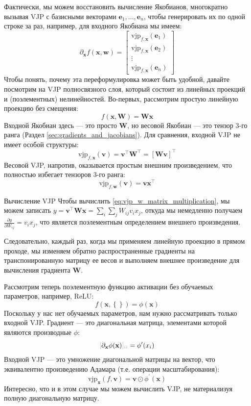 Фактически, мы можем восстановить вычисление Якобианов, многократно вызывая VJP с базисными векторами $\mathbf{e}_1, \ldots, \mathbf{e}_n$, чтобы генерировать их по одной строке за раз, например, для входного Якобиана мы имеем:
%
$$\partial_{\mathbf{x}}f(\mathbf{x},\mathbf{w})=\begin{bmatrix} \text{vjp}_{f,\mathbf{x}}(\mathbf{e}_1) \\ \text{vjp}_{f,\mathbf{x}}(\mathbf{e}_2) \\ \vdots\\ \text{vjp}_{f,\mathbf{x}}(
\mathbf{e}_n) \end{bmatrix}$$
%
Чтобы понять, почему эта переформулировка может быть удобной, давайте посмотрим на VJP полносвязного слоя, который состоит из линейных проекций и (поэлементных) нелинейностей. Во-первых, рассмотрим простую линейную проекцию без смещения:
%
$$
f(\mathbf{x}, \mathbf{W})=\mathbf{W}\mathbf{x}
$$
%
Входной Якобиан здесь — это просто $\mathbf{W}$, но весовой Якобиан — это тензор 3-го ранга (Раздел \ref{sec:gradients_and_jacobians}). Для сравнения, входной VJP не имеет особой структуры:
%
\begin{equation}
\text{vjp}_{f, \mathbf{x}}(\mathbf{v})=\mathbf{v}^\top\mathbf{W}^\top = \left[\mathbf{W}\mathbf{v}\right]^\top
\label{eq:vjp_x_matrix_multiplication}
\end{equation}
%
Весовой VJP, напротив, оказывается простым внешним произведением, что полностью избегает тензоров 3-го ранга:
%
\begin{equation}
\text{vjp}_{f,\mathbf{w}}(\mathbf{v}) = \mathbf{v}\mathbf{x}^\top
\label{eq:vjp_w_matrix_multiplication}
\end{equation}
%
\begin{supportbox}{Вычисление VJP}
Чтобы вычислить \eqref{eq:vjp_w_matrix_multiplication}, мы можем записать $y=\mathbf{v}^\top \mathbf{W}\mathbf{x} =\sum_i\sum_j W_{ij}v_ix_j$, откуда мы немедленно получаем $\frac{\partial y}{\partial W_{ij}} = v_ix_j$, что является поэлементным определением внешнего произведения.
\end{supportbox}
%
Следовательно, каждый раз, когда мы применяем линейную проекцию в прямом проходе, мы изменяем обратно распространенные градиенты на транспонированную матрицу ее весов и выполняем внешнее произведение для вычисления градиента $\mathbf{W}$. 

Рассмотрим теперь поэлементную функцию активации без обучаемых параметров, например, ReLU:
%
$$
f(\mathbf{x},\left\{\right\})=\phi(\mathbf{x})
$$
%
Поскольку у нас нет обучаемых параметров, нам нужно рассматривать только входной VJP. Градиент — это диагональная матрица, элементами которой являются производные $\phi$:
%
$$\idx{\partial_{\mathbf{x}} \phi(\mathbf{x})}{ii}=\phi^\prime(x_i)$$
%
Входной VJP — это умножение диагональной матрицы на вектор, что эквивалентно произведению Адамара (т.е. операции масштабирования):
%
\begin{equation}
\text{vjp}_{\mathbf{x}}(f,\mathbf{v})=\mathbf{v}\odot \phi^\prime(\mathbf{x})
\label{eq:backward_pass_activation_function}
\end{equation}
%
Интересно, что и в этом случае мы можем вычислить VJP, не материализуя полную диагональную матрицу.

